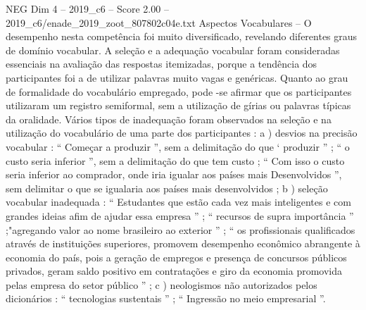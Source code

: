 \begin{textsample}{NEG Dim 4 – 2019\_c6 – Score 2.00 – 2019\_c6/enade\_2019\_zoot\_807802c04e.txt}
Aspectos Vocabulares – O desempenho nesta competência foi muito diversificado, revelando diferentes graus de domínio vocabular.
A seleção e a adequação vocabular foram consideradas essenciais na avaliação das respostas itemizadas, porque a tendência dos participantes foi a de utilizar palavras muito vagas e genéricas.
Quanto ao grau de formalidade do vocabulário empregado, pode -se afirmar que os participantes utilizaram um registro semiformal, sem a utilização de gírias ou palavras típicas da oralidade.
Vários tipos de inadequação foram observados na seleção e na utilização do vocabulário de uma parte dos participantes : a ) desvios na precisão vocabular : “ Começar a produzir ”, sem a delimitação do que ‘ produzir ” ; “ o custo seria inferior ”, sem a delimitação do que tem custo ; “ Com isso o custo seria inferior ao comprador, onde iria igualar aos países mais Desenvolvidos ”, sem delimitar o que se igualaria aos países mais desenvolvidos ; b ) seleção vocabular inadequada : “ Estudantes que estão cada vez mais inteligentes e com grandes ideias afim de ajudar essa empresa ” ; “ recursos de supra importância ” ;"agregando valor ao nome brasileiro ao exterior ” ; “ os profissionais qualificados através de instituições superiores, promovem desempenho econômico abrangente à economia do país, pois a geração de empregos e presença de concursos públicos privados, geram saldo positivo em contratações e giro da economia promovida pelas empresa do setor público ” ; c ) neologismos não autorizados pelos dicionários : “ tecnologias sustentais ” ; “ Ingressão no meio empresarial ”.

\end{textsample}
